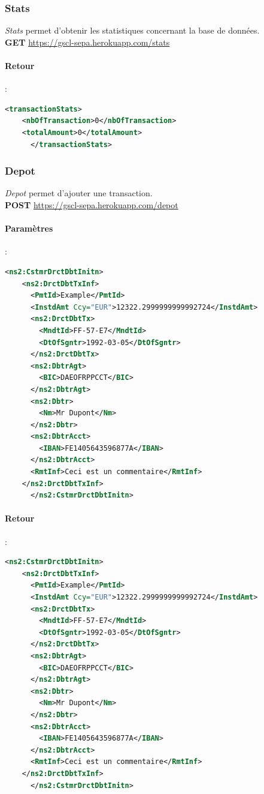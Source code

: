 \documentclass{article}
\begin{document}
      \subsubsection{Stats}
	\emph{Stats} permet d'obtenir les statistiques concernant la base de données.\\
	\textbf{GET} \url{https://gscl-sepa.herokuapp.com/stats}
	\paragraph{Retour}:
	  \begin{lstlisting}[language=xml]
      <transactionStats>
	<nbOfTransaction>0</nbOfTransaction>
	<totalAmount>0</totalAmount>
      </transactionStats>
	    \end{lstlisting}
      \subsubsection{Depot}
	\emph{Depot} permet d'ajouter une transaction.\\
	\textbf{POST} \url{https://gscl-sepa.herokuapp.com/depot}
	\paragraph{Paramètres}:
	  \begin{lstlisting}[language=xml]
      <ns2:CstmrDrctDbtInitn>
	<ns2:DrctDbtTxInf>
	  <PmtId>Example</PmtId>
	  <InstdAmt Ccy="EUR">12322.2999999999992724</InstdAmt>
	  <ns2:DrctDbtTx>
	    <MndtId>FF-57-E7</MndtId>
	    <DtOfSgntr>1992-03-05</DtOfSgntr>
	  </ns2:DrctDbtTx>
	  <ns2:DbtrAgt>
	    <BIC>DAEOFRPPCCT</BIC>
	  </ns2:DbtrAgt>
	  <ns2:Dbtr>
	    <Nm>Mr Dupont</Nm>
	  </ns2:Dbtr>
	  <ns2:DbtrAcct>
	    <IBAN>FE1405643596877A</IBAN>
	  </ns2:DbtrAcct>
	  <RmtInf>Ceci est un commentaire</RmtInf>
	</ns2:DrctDbtTxInf>
      </ns2:CstmrDrctDbtInitn>
	  \end{lstlisting}
	\paragraph{Retour}:
	  \begin{lstlisting}[language=xml]
      <ns2:CstmrDrctDbtInitn>
	<ns2:DrctDbtTxInf>
	  <PmtId>Example</PmtId>
	  <InstdAmt Ccy="EUR">12322.2999999999992724</InstdAmt>
	  <ns2:DrctDbtTx>
	    <MndtId>FF-57-E7</MndtId>
	    <DtOfSgntr>1992-03-05</DtOfSgntr>
	  </ns2:DrctDbtTx>
	  <ns2:DbtrAgt>
	    <BIC>DAEOFRPPCCT</BIC>
	  </ns2:DbtrAgt>
	  <ns2:Dbtr>
	    <Nm>Mr Dupont</Nm>
	  </ns2:Dbtr>
	  <ns2:DbtrAcct>
	    <IBAN>FE1405643596877A</IBAN>
	  </ns2:DbtrAcct>
	  <RmtInf>Ceci est un commentaire</RmtInf>
	</ns2:DrctDbtTxInf>
      </ns2:CstmrDrctDbtInitn>
	  \end{lstlisting}
\end{document}
